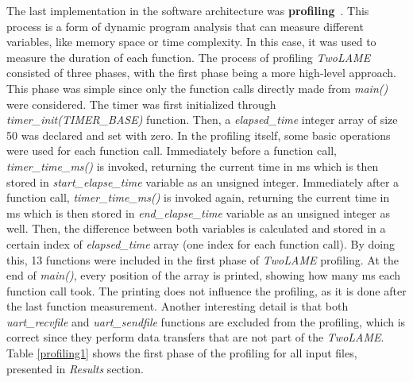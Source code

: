The last implementation in the software architecture was \textbf{profiling}~\cite{profiling}. This process is a form of dynamic program analysis that can measure different variables, like memory space or time complexity. In this case, it was used to measure the duration of each function.
The process of profiling \textit{TwoLAME} consisted of three phases, with the first phase being a more high-level approach. 
This phase was simple since only the function calls directly made from \textit{main()} were considered. The timer was first initialized through \textit{timer\_init(TIMER\_BASE)} function. Then, a \textit{elapsed\_time} integer array of size 50 was declared and set with zero. In the profiling itself, some basic operations were used for each function call. Immediately before a function call, \textit{timer\_time\_ms()} is invoked, returning the current time in ms which is then stored in \textit{start\_elapse\_time} variable as an unsigned integer. Immediately after a function call, \textit{timer\_time\_ms()} is invoked again, returning the current time in ms which is then stored in \textit{end\_elapse\_time} variable as an unsigned integer as well. Then, the difference between both variables is calculated and stored in a certain index of \textit{elapsed\_time} array (one index for each function call). 
By doing this, 13 functions were included in the first phase of \textit{TwoLAME} profiling. At the end of \textit{main()}, every position of the array is printed, showing how many ms each function call took. The printing does not influence the profiling, as it is done after the last function measurement. Another interesting detail is that both \textit{uart\_recvfile} and \textit{uart\_sendfile} functions are excluded from the profiling, which is correct since they perform data transfers that are not part of the \textit{TwoLAME}.
Table \ref{profiling1} shows the first phase of the profiling for all input files, presented in \textit{Results} section.

